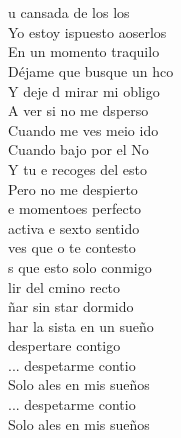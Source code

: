 \begin{cancion}[Despertar][Estopa]%
{}\vspace*{-0.4cm}\\
	            \\
	   u cansada de los los\\
	 Yo estoy ispuesto aoserlos\\
	    En un momento traquilo\\
	Déjame que busque un hco\\
	Y deje d mirar mi obligo\\
	   A ver si no me dsperso\\
	    Cuando me ves meio ido\\
	Cuando bajo por el No\\
	Y tu e recoges del esto\\
	    Pero no me despierto\\
\jump
	e momentoes perfecto\\
	 activa e sexto sentido\\
	 ves que o te contesto\\
	s que esto solo conmigo\\
	lir del cmino recto\\
	ñar sin star dormido\\
	har la sista en un sueño\\
	 despertare contigo\\
\jump
	... despetarme contio\\
	Solo ales en mis sueños\\
	... despetarme contio\\
	Solo ales en mis sueños\\
\jump
	       \\
	\jump\\

\end{cancion}
